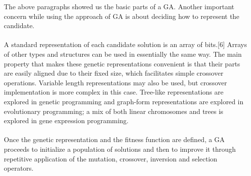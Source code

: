 \documentclass[a4paper, 12pt]{article}
\begin{document}
The above paragraphs showed us the basic parts of a GA. Another important concern while using the approach of GA is about deciding how to represent the candidate.\\~\\
\noindent A standard representation of each candidate solution is an array of bits.[6] Arrays of other types and structures can be used in essentially the same way. The main property that makes these genetic representations convenient is that their parts are easily aligned due to their fixed size, which facilitates simple crossover operations. Variable length representations may also be used, but crossover implementation is more complex in this case. Tree-like representations are explored in genetic programming and graph-form representations are explored in evolutionary programming; a mix of both linear chromosomes and trees is explored in gene expression programming.\\~\\
\noindent
Once the genetic representation and the fitness function are defined, a GA proceeds to initialize a population of solutions and then to improve it through repetitive application of the mutation, crossover, inversion and selection operators.
\end{document}
